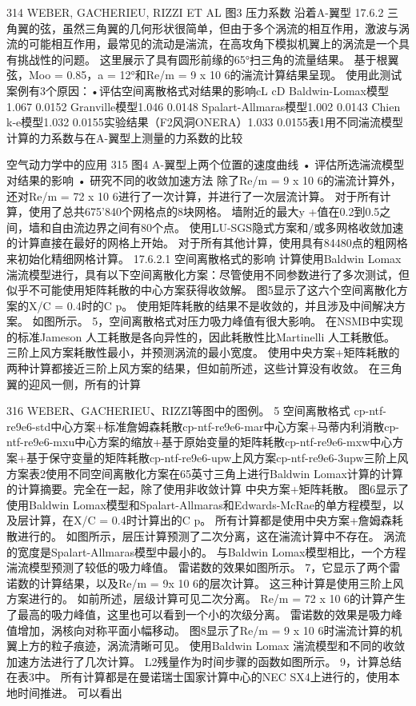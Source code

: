 \documentclass[UTF8,11pt,a4paper,openany,fontset=fandol]{ctexbook}
\begin{document}
314 WEBER, GACHERIEU, RIZZI ET AL 图3 压力系数 沿着A-翼型 17.6.2 三角翼的弦，虽然三角翼的几何形状很简单，但由于多个涡流的相互作用，激波与涡流的可能相互作用，最常见的流动是湍流，在高攻角下模拟机翼上的涡流是一个具有挑战性的问题。 这里展示了具有圆形前缘的65°扫三角的流量结果。 基于根翼弦，Moo = 0.85，a = 12°和Re/m = 9 x 10 6的湍流计算结果呈现。 使用此测试案例有3个原因：•评估空间离散格式对结果的影响cL cD Baldwin-Lomax模型1.067 0.0152 Granville模型1.046 0.0148 Spalart-Allmaras模型1.002 0.0143 Chien k-e模型1.032 0.0155实验结果（F2风洞ONERA）1.033 0.0155表1用不同湍流模型计算的力系数与在A-翼型上测量的力系数的比较

空气动力学中的应用 315 图4 A-翼型上两个位置的速度曲线 • 评估所选湍流模型对结果的影响 • 研究不同的收敛加速方法 除了Re/m = 9 x 10 6的湍流计算外，还对Re/m = 72 x 10 6进行了一次计算，并进行了一次层流计算。 对于所有计算，使用了总共675'840个网格点的8块网格。 墙附近的最大y +值在0.2到0.5之间，墙和自由流边界之间有80个点。 使用LU-SGS隐式方案和/或多网格收敛加速的计算直接在最好的网格上开始。 对于所有其他计算，使用具有84480点的粗网格来初始化精细网格计算。 17.6.2.1 空间离散格式的影响 计算使用Baldwin Lomax 湍流模型进行，具有以下空间离散化方案：尽管使用不同参数进行了多次测试，但似乎不可能使用矩阵耗散的中心方案获得收敛解。 图5显示了这六个空间离散化方案的X/C = 0.4时的C p。 使用矩阵耗散的结果不是收敛的，并且涉及中间解决方案。 如图所示。 5，空间离散格式对压力吸力峰值有很大影响。 在NSMB中实现的标准Jameson 人工耗散是各向异性的，因此耗散性比Martinelli 人工耗散低。 三阶上风方案耗散性最小，并预测涡流的最小宽度。 使用中央方案+矩阵耗散的两种计算都接近三阶上风方案的结果，但如前所述，这些计算没有收敛。 在三角翼的迎风一侧，所有的计算

316 WEBER、GACHERIEU、RIZZI等图中的图例。 5 空间离散格式 cp-ntf-re9e6-std中心方案+标准詹姆森耗散cp-ntf-re9e6-mar中心方案+马蒂内利消散cp-ntf-re9e6-mxu中心方案的缩放+基于原始变量的矩阵耗散cp-ntf-re9e6-mxw中心方案+基于保守变量的矩阵耗散cp-ntf-re9e6-upw上风方案cp-ntf-re9e6-3upw三阶上风方案表2使用不同空间离散化方案在65英寸三角上进行Baldwin Lomax计算的计算的计算摘要。完全在一起，除了使用非收敛计算 中央方案+矩阵耗散。 图6显示了使用Baldwin Lomax模型和Spalart-Allmaras和Edwards-McRae的单方程模型，以及层计算，在X/C = 0.4时计算出的C p。 所有计算都是使用中央方案+詹姆森耗散进行的。 如图所示，层压计算预测了二次分离，这在湍流计算中不存在。 涡流的宽度是Spalart-Allmaras模型中最小的。 与Baldwin Lomax模型相比，一个方程湍流模型预测了较低的吸力峰值。 雷诺数的效果如图所示。 7，它显示了两个雷诺数的计算结果，以及Re/m = 9x 10 6的层次计算。 这三种计算是使用三阶上风方案进行的。 如前所述，层级计算可见二次分离。 Re/m = 72 x 10 6的计算产生了最高的吸力峰值，这里也可以看到一个小的次级分离。 雷诺数的效果是吸力峰值增加，涡核向对称平面小幅移动。 图8显示了Re/m = 9 x 10 6时湍流计算的机翼上方的粒子痕迹，涡流清晰可见。 使用Baldwin Lomax 湍流模型和不同的收敛加速方法进行了几次计算。 L2残量作为时间步骤的函数如图所示。 9，计算总结在表3中。 所有计算都是在曼诺瑞士国家计算中心的NEC SX4上进行的，使用本地时间推进。 可以看出
\end{document}
